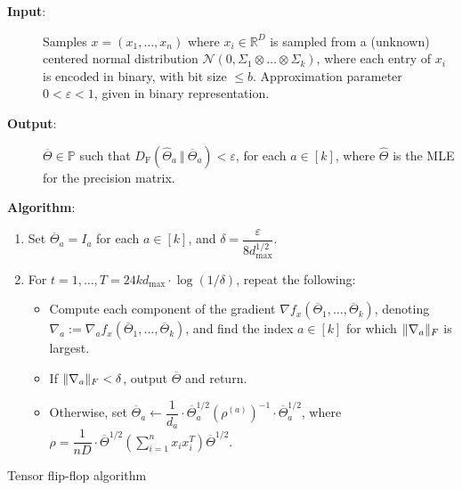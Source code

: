 \documentclass[aos]{imsart}
\theoremstyle{definition}
\numberwithin{equation}{section}
\DeclarePairedDelimiter{\norm}{\lVert}{\rVert}
\newcommand{\R}{{\mathbb{R}}}
\newcommand{\otheta}{\overline{\Theta}}
\newcommand{\htheta}{\widehat{\Theta}}
\newcommand{\ot}{\otimes}
\newcommand{\eps}{\varepsilon}
\newcommand{\cN}{\mathcal{N}}
\newcommand{\SPD}{\mathbb{P}}
\newcommand{\samp}{x}
\newcommand{\DF}{D_{\operatorname{F}}}
\def\dmax{d_{\max}}
\begin{document}
\begin{Algorithm}
\begin{description}
\item[\hspace{.2cm}\textbf{Input}:] Samples $\samp = (\samp_1, \ldots, \samp_n)$ where $\samp_i \in \R^D$ is sampled from a (unknown) centered normal distribution $\cN(0, \Sigma_1 \ot \dots \ot \Sigma_k)$, where each entry of $\samp_i$ is encoded in binary, with bit size $\le b$. Approximation parameter $0 < \eps < 1$, given in binary representation. \\[.3ex]

\item[\hspace{.2cm}\textbf{Output}:] $\otheta \in \SPD$ such that $\DF(\htheta_a \ \Vert  \ \otheta_a) < \eps$, for each $a \in [k]$, where $\htheta$ is the MLE for the precision matrix. \\[.3ex]

\item[\hspace{.2cm}\textbf{Algorithm}:]
\end{description}
\begin{enumerate}
\item\label{it:tensor-flip-flop step 1} Set $\otheta_a = I_a$ for each $a \in [k]$, and
$\delta = \dfrac{\eps}{8 \dmax^{1/2}}$.

\vspace{5pt}

\item\label{it:tensor-flip-flop step 2} For $t=1,\dots,T = 24 k \dmax \cdot \log(1/\delta)$, repeat the following:

\vspace{5pt}

\begin{itemize}
\item Compute each component of the gradient $\nabla f_{\samp}(\otheta_1, \ldots, \otheta_k)$, denoting $\nabla_a := \nabla_a f_{\samp}(\otheta_1, \ldots, \otheta_k)$, and find the index $a \in [k]$ for which $\norm{\nabla_a}_F$ is largest.

\vspace{5pt}

\item
If $\norm{\nabla_a}_F < \delta$, output $\otheta$ and return.

\vspace{5pt}

\item Otherwise, set $\otheta_a \leftarrow  \dfrac{1}{d_a} \cdot \otheta_a^{1/2} (\rho^{(a)})^{-1} \cdot \otheta_a^{1/2}$, where $\rho = \dfrac{1}{nD} \cdot \otheta^{1/2} \left( \sum_{i=1}^n x_ix_i^T \right) \otheta^{1/2}.$
\end{itemize}
\end{enumerate}
\caption{Tensor flip-flop algorithm}\label{alg:tensor-flip-flop}
\end{Algorithm}
\end{document}
